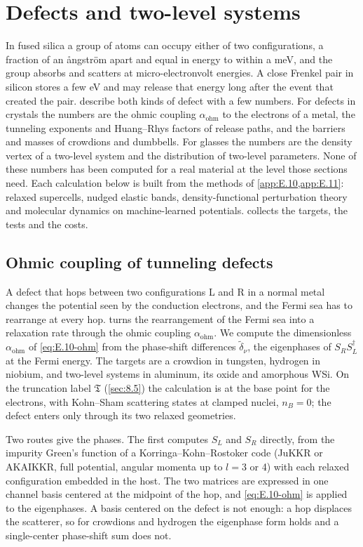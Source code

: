 \section{Defects and two-level systems}\label{app:E.22}

In fused silica a group of atoms can occupy either of two configurations, a fraction of an \r{a}ngstr\"om apart and equal in energy to within a meV, and the group absorbs and scatters at micro-electronvolt energies. A close Frenkel pair in silicon stores a few eV and may release that energy long after the event that created the pair.  describe both kinds of defect with a few numbers. For defects in crystals the numbers are the ohmic coupling $\alpha_{\mathrm{ohm}}$ to the electrons of a metal, the tunneling exponents and Huang--Rhys factors of release paths, and the barriers and masses of crowdions and dumbbells. For glasses the numbers are the density vertex of a two-level system and the distribution of two-level parameters. None of these numbers has been computed for a real material at the level those sections need. Each calculation below is built from the methods of \cref{app:E.10,app:E.11}: relaxed supercells, nudged elastic bands, density-functional perturbation theory and molecular dynamics on machine-learned potentials.  collects the targets, the tests and the costs.

\subsection{Ohmic coupling of tunneling defects}

A defect that hops between two configurations L and R in a normal metal changes the potential seen by the conduction electrons, and the Fermi sea has to rearrange at every hop.  turns the rearrangement of the Fermi sea into a relaxation rate through the ohmic coupling $\alpha_{\mathrm{ohm}}$. We compute the dimensionless $\alpha_{\mathrm{ohm}}$ of \cref{eq:E.10-ohm} from the phase-shift differences $\tilde\delta_\nu$, the eigenphases of $S_RS_L^\dagger$ at the Fermi energy. The targets are a crowdion in tungsten, hydrogen in niobium, and two-level systems in aluminum, its oxide and amorphous WSi. On the truncation label $\mathfrak{T}$ (\cref{sec:8.5}) the calculation is at the base point for the electrons, with Kohn--Sham scattering states at clamped nuclei, $n_B = 0$; the defect enters only through its two relaxed geometries.

Two routes give the phases. The first computes $S_L$ and $S_R$ directly, from the impurity Green's function of a Korringa--Kohn--Rostoker code (JuKKR or AKAIKKR, full potential, angular momenta up to $l = 3$ or 4) with each relaxed configuration embedded in the host. The two matrices are expressed in one channel basis centered at the midpoint of the hop, and \cref{eq:E.10-ohm} is applied to the eigenphases. A basis centered on the defect is not enough: a hop displaces the scatterer, so for crowdions and hydrogen the eigenphase form holds and a single-center phase-shift sum does not.

